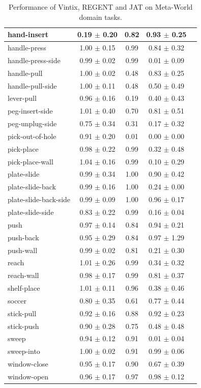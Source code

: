 \documentclass{article}
\theoremstyle{plain}
\theoremstyle{definition}
\theoremstyle{remark}
\begin{document}
\begin{table}[]
{\begin{tabular}{|l|c|c|c|c|}
hand-insert & 0.19 $\pm$ 0.20 & 0.82 & 0.93 $\pm$ 0.25 \\ \hline
handle-press & 1.00 $\pm$ 0.15 & 0.99 & 0.84 $\pm$ 0.32 \\ \hline
handle-press-side & 0.99 $\pm$ 0.02 & 0.99 & 0.01 $\pm$ 0.09 \\ \hline
handle-pull & 1.00 $\pm$ 0.02 & 0.48 & 0.83 $\pm$ 0.25 \\ \hline
handle-pull-side & 1.00 $\pm$ 0.11 & 0.48 & 0.50 $\pm$ 0.49 \\ \hline
lever-pull & 0.96 $\pm$ 0.16 & 0.19 & 0.40 $\pm$ 0.43 \\ \hline
peg-insert-side & 1.01 $\pm$ 0.40 & 0.70 & 0.81 $\pm$ 0.51 \\ \hline
peg-unplug-side & 0.75 $\pm$ 0.34 & 0.31 & 0.17 $\pm$ 0.32 \\ \hline
pick-out-of-hole & 0.91 $\pm$ 0.20 & 0.01 & 0.00 $\pm$ 0.00 \\ \hline
pick-place & 0.98 $\pm$ 0.22 & 0.99 & 0.32 $\pm$ 0.48 \\ \hline
pick-place-wall & 1.04 $\pm$ 0.16 & 0.99 & 0.10 $\pm$ 0.29 \\ \hline
plate-slide & 0.99 $\pm$ 0.34 & 1.00 & 0.90 $\pm$ 0.42 \\ \hline
plate-slide-back & 0.99 $\pm$ 0.16 & 1.00 & 0.24 $\pm$ 0.00 \\ \hline
plate-slide-back-side & 0.99 $\pm$ 0.09 & 1.00 & 0.96 $\pm$ 0.17 \\ \hline
plate-slide-side & 0.83 $\pm$ 0.22 & 0.99 & 0.16 $\pm$ 0.04 \\ \hline
push & 0.97 $\pm$ 0.14 & 0.84 & 0.94 $\pm$ 0.21 \\ \hline
push-back & 0.95 $\pm$ 0.29 & 0.84 & 0.97 $\pm$ 1.29 \\ \hline
push-wall & 0.99 $\pm$ 0.02 & 0.81 & 0.21 $\pm$ 0.30 \\ \hline
reach & 1.01 $\pm$ 0.26 & 0.99 & 0.34 $\pm$ 0.32 \\ \hline
reach-wall & 0.98 $\pm$ 0.17 & 0.99 & 0.81 $\pm$ 0.37 \\ \hline
shelf-place & 1.01 $\pm$ 0.11 & 0.96 & 0.38 $\pm$ 0.46 \\ \hline
soccer & 0.80 $\pm$ 0.35 & 0.61 & 0.77 $\pm$ 0.44 \\ \hline
stick-pull & 0.92 $\pm$ 0.16 & 0.88 & 0.92 $\pm$ 0.23 \\ \hline
stick-push & 0.90 $\pm$ 0.28 & 0.75 & 0.48 $\pm$ 0.48 \\ \hline
sweep & 0.94 $\pm$ 0.12 & 0.91 & 0.01 $\pm$ 0.04 \\ \hline
sweep-into & 1.00 $\pm$ 0.02 & 0.91 & 0.99 $\pm$ 0.06 \\ \hline
window-close & 0.95 $\pm$ 0.17 & 0.90 & 0.67 $\pm$ 0.39 \\ \hline
window-open & 0.96 $\pm$ 0.17 & 0.97 & 0.98 $\pm$ 0.12 \\ \hline
\end{tabular}}
\caption{Performance of Vintix, REGENT and JAT on Meta-World domain tasks.}
\end{table}


\end{document}
